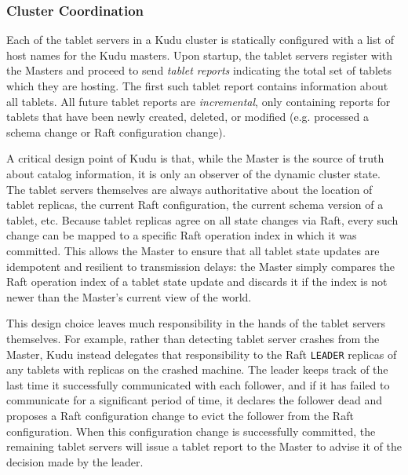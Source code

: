\documentclass{vldb}
\begin{document}
\subsubsection{Cluster Coordination}
\label{sec:cluster_coordination}

Each of the tablet servers in a Kudu cluster is statically configured with a list of host names
for the Kudu masters. Upon startup, the tablet servers register with the Masters and proceed to send
{\em tablet reports} indicating the total set of tablets which they are hosting.
The first such tablet report contains information about all tablets. All future tablet
reports are {\em incremental}, only containing reports for tablets that have been
newly created, deleted, or modified (e.g. processed a schema change or Raft configuration
change).

A critical design point of Kudu is that, while the Master is the source of truth about
catalog information, it is only an observer of the dynamic cluster state.
The tablet servers themselves are always authoritative about the location of tablet
replicas, the current Raft configuration, the current schema version of a tablet, etc.
Because tablet replicas agree on all state changes via Raft, every such change
can be mapped to a specific Raft operation index in which it was committed. This allows
the Master to ensure that all tablet state updates are idempotent
and resilient to transmission delays: the Master simply compares the Raft operation index
of a tablet state update and discards it if the index is not newer than the Master's current
view of the world.

This design choice leaves much responsibility in the hands of the tablet servers themselves.
For example, rather than detecting tablet server crashes from the Master, Kudu instead
delegates that responsibility to the Raft {\tt LEADER} replicas of any tablets with replicas
on the crashed machine. The leader keeps track
of the last time it successfully communicated with each follower, and if it has failed
to communicate for a significant period of time, it declares the follower dead and proposes
a Raft configuration change to evict the follower from the Raft configuration. When this
configuration change is successfully committed, the remaining tablet servers will
issue a tablet report to the Master to advise it of the decision made by the leader.
\end{document}

